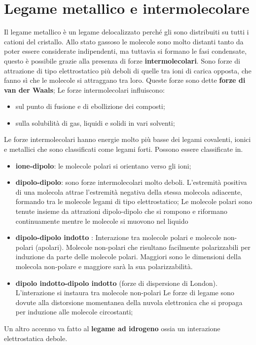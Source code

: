 \documentclass[11pt, a4paper, openright]{book}
\begin{document}
\section{Legame metallico e intermolecolare}
Il legame metallico è un legame delocalizzato perché gli sono distribuiti su tutti i cationi del cristallo. Allo stato gassoso le molecole sono molto distanti tanto da poter essere considerate indipendenti, ma tuttavia si formano le fasi condensate, questo è possibile grazie alla presenza di forze  \textbf{intermolecolari}. Sono forze di attrazione di tipo elettrostatico più deboli di quelle tra ioni di carica opposta, che fanno sì che le molecole si attraggano tra loro.
Queste forze sono dette \textbf{forze di van der Waals};
Le forze intermolecolari influiscono:
\begin{itemize}
    \item sul punto di fusione e di ebollizione dei composti;
    \item sulla solubilità di gas, liquidi e solidi in vari solventi;
\end{itemize}
Le forze intermolecolari hanno energie molto più basse dei
legami covalenti, ionici e metallici che sono classificati come
legami forti.
Possono essere classificate in.
\begin{itemize}
    \item \textbf{ione-dipolo}: le molecole polari si orientano verso gli ioni;
    \item \textbf{dipolo-dipolo}: sono forze intermolecolari molto deboli. L'estremità positiva di una molecola attrae l'estremità negativa della stessa molecola adiacente, formando tra le molecole legami di tipo elettrostatico;
    Le molecole polari sono tenute insieme da attrazioni dipolo-dipolo che si rompono e riformano continuamente mentre le molecole si muovono nel liquido
    \item \textbf{dipolo-dipolo indotto }: Interazione tra molecole polari e molecole non-polari (apolari).
    Molecole non-polari che risultano facilmente polarizzabili per induzione da parte delle molecole polari. Maggiori sono le dimensioni della molecola non-polare e maggiore sarà la sua polarizzabilità.
    \item \textbf{dipolo indotto-dipolo indotto} (forze di dispersione di London). L'interazione si instaura tra molecole non-polari Le forze di legame sono dovute alla distorsione momentanea della nuvola elettronica che si propaga per induzione alle molecole circostanti;
\end{itemize}
Un altro accenno va fatto al \textbf{legame ad idrogeno} ossia un interazione elettrostatica debole.
\end{document}
